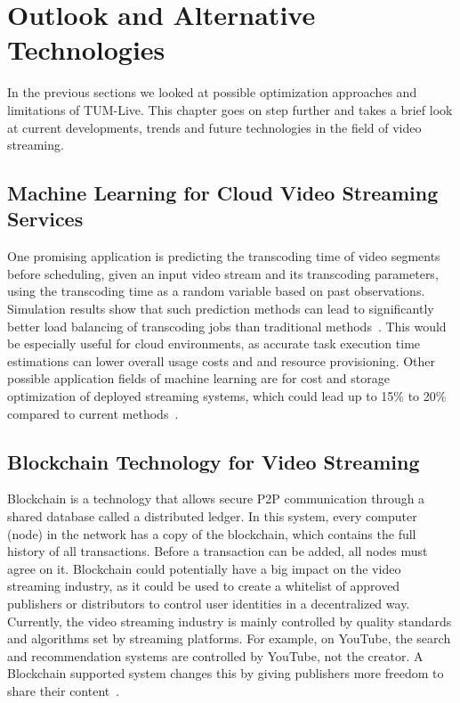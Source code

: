 
\chapter{Outlook and Alternative Technologies}\label{chapter:outlook}

In the previous sections we looked at possible optimization approaches and limitations of TUM-Live. This chapter goes on step further and takes a brief look at current developments, trends and future technologies in the field of video streaming.

\section{Machine Learning for Cloud Video Streaming Services}

One promising application is predicting the transcoding time of video segments before scheduling, given an input video stream and its transcoding parameters, using the transcoding time as a random variable based on past observations. Simulation results show that such prediction methods can lead to significantly better load balancing of transcoding jobs than traditional methods~\parencite{cloud_predicting}.
This would be especially useful for cloud environments, as accurate task execution time estimations can lower overall usage costs and and resource provisioning. Other possible application fields of machine learning are for cost and storage optimization of deployed streaming systems, which could lead up to 15\% to 20\% compared to current methods~\parencite{deep_learning_cloud}.

\section{Blockchain Technology for Video Streaming}

Blockchain is a technology that allows secure \ac{P2P} communication through a shared database called a distributed ledger. In this system, every computer (node) in the network has a copy of the blockchain, which contains the full history of all transactions. Before a transaction can be added, all nodes must agree on it.
Blockchain could potentially have a big impact on the video streaming industry, as it could be used to create a whitelist of approved publishers or distributors to control user identities in a decentralized way.
Currently, the video streaming industry is mainly controlled by quality standards and algorithms set by streaming platforms. For example, on YouTube, the search and recommendation systems are controlled by YouTube, not the creator. A Blockchain supported system changes this by giving publishers more freedom to share their content~\parencite{cloud_streaming}.

